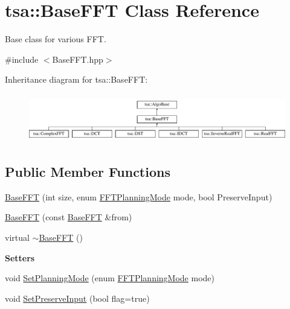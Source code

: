\hypertarget{classtsa_1_1_base_f_f_t}{}\section{tsa\+:\+:Base\+F\+FT Class Reference}
\label{classtsa_1_1_base_f_f_t}


Base class for various F\+FT.  




{\ttfamily \#include $<$Base\+F\+F\+T.\+hpp$>$}

Inheritance diagram for tsa\+:\+:Base\+F\+FT\+:\begin{figure}[H]
\begin{center}
\leavevmode
\includegraphics[height=2.121212cm]{classtsa_1_1_base_f_f_t}
\end{center}
\end{figure}
\subsection*{Public Member Functions}
\begin{DoxyCompactItemize}
\item 
\hyperlink{classtsa_1_1_base_f_f_t_a724f59f3f5bded31174373eac81e67ee}{Base\+F\+FT} (int size, enum \hyperlink{namespacetsa_a217e07ef78939f88b22c8428ac96b1ae}{F\+F\+T\+Planning\+Mode} mode, bool Preserve\+Input)
\item 
\hyperlink{classtsa_1_1_base_f_f_t_a84fa441e825a8e375f9721263d358ac8}{Base\+F\+FT} (const \hyperlink{classtsa_1_1_base_f_f_t}{Base\+F\+FT} \&from)
\item 
virtual \hyperlink{classtsa_1_1_base_f_f_t_ad73b78693c83ef6c7e07701965ae8cb6}{$\sim$\+Base\+F\+FT} ()
\end{DoxyCompactItemize}
\begin{Indent}\textbf{ Setters}\par
\begin{DoxyCompactItemize}
\item 
void \hyperlink{classtsa_1_1_base_f_f_t_a4a8b00feb20dc3ace768d3c851143a03}{Set\+Planning\+Mode} (enum \hyperlink{namespacetsa_a217e07ef78939f88b22c8428ac96b1ae}{F\+F\+T\+Planning\+Mode} mode)
\item 
void \hyperlink{classtsa_1_1_base_f_f_t_a5b1e2f36dbdfe197aa6c74d1cf963f40}{Set\+Preserve\+Input} (bool flag=true)
\end{DoxyCompactItemize}
\end{Indent}
